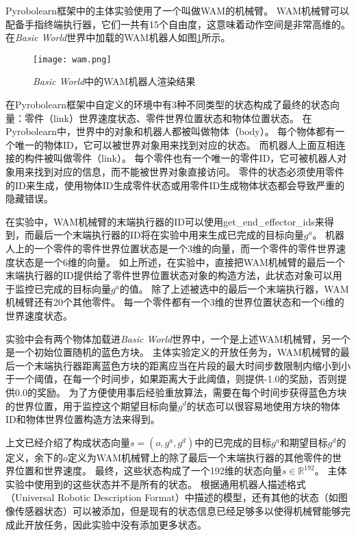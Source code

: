 Pyrobolearn框架中的主体实验使用了一个叫做WAM的机械臂。
WAM机械臂可以配备手指终端执行器，它们一共有15个自由度，这意味着动作空间是非常高维的。
在\emph{Basic World}世界中加载的WAM机器人如图\ref{wam}所示。
    \begin{figure}[htpb]
        \centering
        \texttt{[image: wam.png]}
        \caption{\emph{Basic World}中的WAM机器人渲染结果}
        \label{wam}
    \end{figure}
在Pyrobolearn框架中自定义的环境中有3种不同类型的状态构成了最终的状态向量：零件（link）世界速度状态、零件世界位置状态和物体位置状态。
在Pyrobolearn中，世界中的对象和机器人都被叫做物体（body）。
每个物体都有一个唯一的物体ID，它可以被世界对象用来找到对应的状态。
而机器人上面互相连接的构件被叫做零件（link）。
每个零件也有一个唯一的零件ID，它可被机器人对象用来找到对应的信息，而不能被世界对象直接访问。
零件的状态必须使用零件的ID来生成，使用物体ID生成零件状态或用零件ID生成物体状态都会导致严重的隐藏错误。

在实验中，WAM机械臂的末端执行器的ID可以使用get\_end\_effector\_ids来得到，而最后一个末端执行器的ID将在实验中用来生成已完成的目标向量$g^a$。
机器人上的一个零件的零件世界位置状态是一个3维的向量，而一个零件的零件世界速度状态是一个6维的向量。
如上所述，在实验中，直接把WAM机械臂的最后一个末端执行器的ID提供给了零件世界位置状态对象的构造方法，此状态对象可以用于监控已完成的目标向量$g^a$的值。
除了上述被选中的最后一个末端执行器，WAM机械臂还有20个其他零件。
每一个零件都有一个3维的世界位置状态和一个6维的世界速度状态。

实验中会有两个物体加载进\emph{Basic World}世界中，一个是上述WAM机械臂，另一个是一个初始位置随机的蓝色方块。
主体实验定义的开放任务为，WAM机械臂的最后一个末端执行器距离蓝色方块的距离应当在片段的最大时间步数限制内缩小到小于一个阈值，在每一个时间步，如果距离大于此阈值，则提供-1.0的奖励，否则提供0.0的奖励。
为了方便使用事后经验重放算法，需要在每个时间步获得蓝色方块的世界位置，用于监控这个期望目标向量$g^d$的状态可以很容易地使用方块的物体ID和物体世界位置构造方法来得到。

上文已经介绍了构成状态向量$s=(o, g^a, g^d)$中的已完成的目标$g^a$和期望目标$g^d$的定义，余下的$o$定义为WAM机械臂上的除了最后一个末端执行器的其他零件的世界位置和世界速度。
最终，这些状态构成了一个192维的状态向量$s\in \mathbb R^{192}$。
主体实验中使用到的这些状态并不是所有的状态。
根据通用机器人描述格式（Universal Robotic Description Format\cite{conf/irc/KangKK19}）中描述的模型，还有其他的状态（如图像传感器状态）可以被添加，但是现有的状态信息已经足够多以使得机械臂能够完成此开放任务，因此实验中没有添加更多状态。

